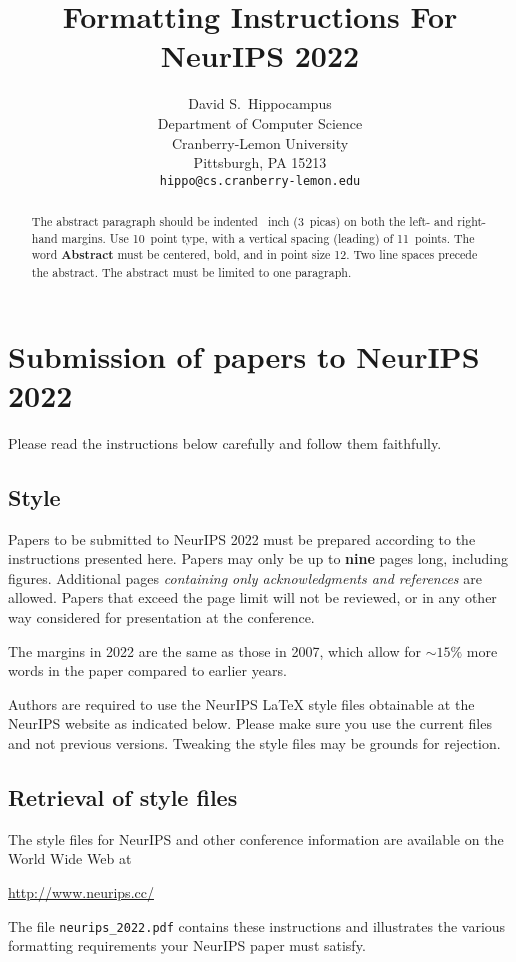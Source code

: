 \documentclass{article}
\title{Formatting Instructions For NeurIPS 2022}
\author{%
      David S.~Hippocampus\\
      Department of Computer Science\\ Cranberry-Lemon University\\ Pittsburgh, PA
      15213 \\ \texttt{hippo@cs.cranberry-lemon.edu} \\
}
\begin{document}
\maketitle

\begin{abstract}
      The abstract paragraph should be indented ~inch (3~picas) on
      both the left- and right-hand margins. Use 10~point type, with a vertical
      spacing (leading) of 11~points.  The word \textbf{Abstract} must be centered,
      bold, and in point size 12. Two line spaces precede the abstract. The abstract
      must be limited to one paragraph.
\end{abstract}

\section{Submission of papers to NeurIPS 2022}

Please read the instructions below carefully and follow them faithfully.

\subsection{Style}

Papers to be submitted to NeurIPS 2022 must be prepared according to the
instructions presented here. Papers may only be up to {\bf nine} pages long,
including figures. Additional pages \emph{containing only acknowledgments and
      references} are allowed. Papers that exceed the page limit will not be
reviewed, or in any other way considered for presentation at the conference.

The margins in 2022 are the same as those in 2007, which allow for $\sim$$15\%$
more words in the paper compared to earlier years.

Authors are required to use the NeurIPS \LaTeX{} style files obtainable at the
NeurIPS website as indicated below. Please make sure you use the current files
and not previous versions. Tweaking the style files may be grounds for
rejection.

\subsection{Retrieval of style files}

The style files for NeurIPS and other conference information are available on
the World Wide Web at
\begin{center}
      \url{http://www.neurips.cc/}
\end{center}
The file \verb+neurips_2022.pdf+ contains these instructions and illustrates the
various formatting requirements your NeurIPS paper must satisfy.
\end{document}
